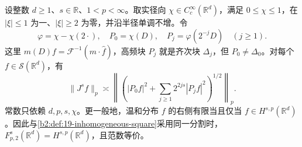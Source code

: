 \begin{proposition}\label{b2:prop:22-bessel-square}
设整数 \(d\geq1\)、\(s\in\mathbb R\)、\(1<p<\infty\)。取实径向
\(\chi\in C_c^\infty(\mathbb R^d)\)，满足 \(0\leq\chi\leq1\)，在
\(|\xi|\leq1\) 为一、\(|\xi|\geq2\) 为零，并沿半径单调不增。令
\[
 \varphi=\chi-\chi(2\cdot),\quad
 P_0=\chi(D),\quad P_j=\varphi(2^{-j}D)\quad(j\geq1).
\]
这里 \(m(D)f=\mathcal F^{-1}(m\cdot\widehat f)\)，高频块 \(P_j\) 就是齐次块 \(\Delta_j\)，但 \(P_0\neq\Delta_0\)。对每个 \(f\in\mathcal S(\mathbb R^d)\)，有
\[
 \|J^sf\|_p\asymp
 \left\|\left(|P_0f|^2+
              \sum_{j\geq1}2^{2js}|P_jf|^2\right)^{1/2}\right\|_p.
\]
常数只依赖 \(d,p,s,\chi\)。更一般地，温和分布 \(f\) 的右侧有限当且仅当 \(f\in H^{s,p}(\mathbb R^d)\)。因此与\cref{b2:def:19-inhomogeneous-square}采用同一分割时，
\(F^s_{p,2}(\mathbb R^d)=H^{s,p}(\mathbb R^d)\)，且范数等价。
\end{proposition}
